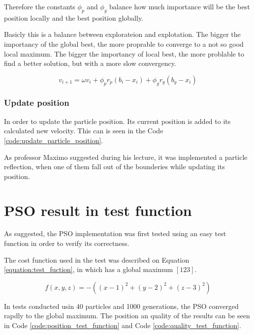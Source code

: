Therefore the constants $\phi_p$ and $\phi_g$ balance how much importance will be the best position locally and the best position globally.

Basicly this is a balance between explorateion and explotation. The bigger the importancy of the global best, the more proprable to converge to a not so good local maximum. The bigger the importancy of local best, the more problable to find a better solution, but with a more slow convergency.

\begin{equation}
    \label{equation:update_velocity}
    v_{i+1} = \omega v_i + \phi_p r_p (b_i - x_i) + \phi_g r_g (b_g - x_i)
\end{equation}

\subsubsection {Update position}

In order to update the particle position. Its current position is added to its calculated new velocity. This can is seen in the Code \ref{code:update_particle_position}.

As professor Maximo suggested during his lecture, it was implemented a particle reflection, when one of them fall out of the bounderies while updating its position.

\section{PSO result in test function}

As suggested, the PSO implementation was first tested using an easy test function in order to verify its correctness.

The cost function used in the test was described on Equation \ref{equation:test_fuction}, in which has a global maximum $[1 2 3]$.

\begin{equation}
    \label{equation:test_fuction}
    f(x, y, z) = -((x - 1)^2 + (y-2)^2 + (z-3)^2)
\end{equation}

In tests conducted usin 40 particles and 1000 generations, the PSO converged rapdly to the global maximum. The position an quality of the results can be seen in Code \ref{code:position_test_function} and Code \ref{code:quality_test_function}.




